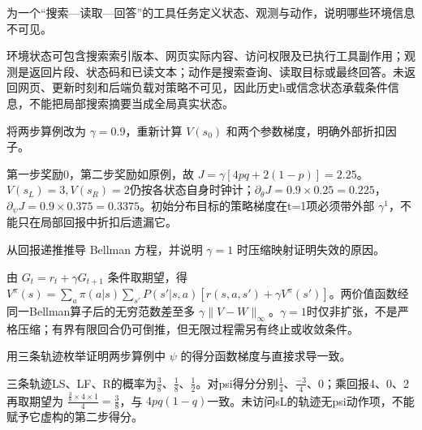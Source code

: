 
\begin{exercises}
\begin{exercise} 为一个“搜索—读取—回答”的工具任务定义状态、观测与动作，说明哪些环境信息不可见。

\begin{solution}
环境状态可包含搜索索引版本、网页实际内容、访问权限及已执行工具副作用；观测是返回片段、状态码和已读文本；动作是搜索查询、读取目标或最终回答。未返回网页、更新时刻和后端负载对策略不可见，因此历史h或信念状态承载条件信息，不能把局部搜索摘要当成全局真实状态。
\end{solution}
\end{exercise}

\begin{exercise} 将两步算例改为 $\gamma=0.9$，重新计算 $V(s_0)$ 和两个参数梯度，明确外部折扣因子。

\begin{solution}
第一步奖励0，第二步奖励如原例，故 $J=\gamma[4pq+2(1-p)]=2.25$。$V(s_L)=3,V(s_R)=2$仍按各状态自身时钟计；$\partial_\theta J=0.9\times0.25=0.225$，$\partial_\psi J=0.9\times0.375=0.3375$。初始分布目标的策略梯度在t=1项必须带外部 $\gamma^1$，不能只在局部回报中折扣后遗漏它。
\end{solution}
\end{exercise}

\begin{exercise}\optional 从回报递推推导 Bellman 方程，并说明 $\gamma=1$ 时压缩映射证明失效的原因。

\begin{solution}
由 $G_t=r_t+\gamma G_{t+1}$ 条件取期望，得 $V^\pi(s)=\sum_a\pi(a|s)\sum_{s'}P(s'|s,a)[r(s,a,s')+\gamma V^\pi(s')]$。两价值函数经同一Bellman算子后的无穷范数差至多 $\gamma\|V-W\|_\infty$。$\gamma=1$时仅非扩张，不是严格压缩；有界有限回合仍可倒推，但无限过程需另有终止或收敛条件。
\end{solution}
\end{exercise}

\begin{exercise} 用三条轨迹枚举证明两步算例中 $\psi$ 的得分函数梯度与直接求导一致。

\begin{solution}
三条轨迹LS、LF、R的概率为$\frac{3}{8}$、$\frac{1}{8}$、$\frac{1}{2}$。对psi得分分别$\frac{1}{4}$、$\frac{-3}{4}$、0；乘回报4、0、2再取期望为 $\frac{\frac{3}{8}\times4\times1}{4}=\frac{3}{8}$，与 $4pq(1-q)$一致。未访问sL的轨迹无psi动作项，不能赋予它虚构的第二步得分。
\end{solution}
\end{exercise}


\end{exercises}
